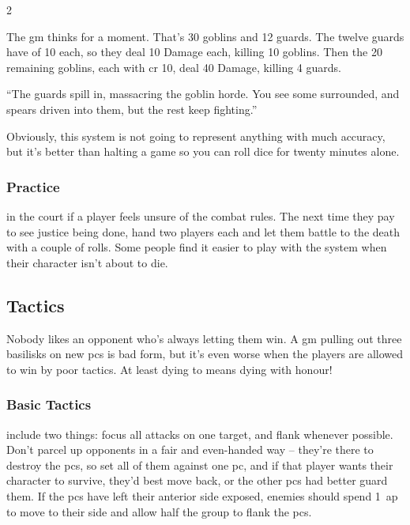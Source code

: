 \begin{multicols}{2}
\begin{exampletext}

  The \gls{gm} thinks for a moment.
  That's 30 goblins and 12 guards.
  The twelve guards have  of 10 each, so they deal 10 Damage each, killing 10 goblins.
  Then the 20 remaining goblins, each with \gls{cr} 10, deal 40 Damage, killing 4 guards.

  ``The guards spill in, massacring the goblin horde.
  You see some surrounded, and spears driven into them, but the rest keep fighting.''

\end{exampletext}

Obviously, this system is not going to represent anything with much accuracy, but it's better than halting a game so you can roll dice for twenty minutes alone.

\subsubsection{Practice}
in the \gls{court} if a player feels unsure of the \gls{combat} rules.
The next time they pay to see justice being done, hand two players  each and let them battle to the death with a couple of rolls.
Some people find it easier to play with the system when their character isn't about to die.

\subsection{Tactics}

Nobody likes an opponent who's always letting them win.
A \gls{gm} pulling out three \glspl{basilisk} on new \glspl{pc} is bad form, but it's even worse when the players are allowed to win by poor tactics.
At least dying to  means dying with honour!

\subsubsection{Basic Tactics}
include two things: focus all attacks on one target, and flank whenever possible.
Don't parcel up opponents in a fair and even-handed way -- they're there to destroy the \glspl{pc}, so set all of them against one \gls{pc}, and if that player wants their character to survive, they'd best move back, or the other \glspl{pc} had better guard them.%
If the \glspl{pc} have left their anterior side exposed, enemies should spend 1~\gls{ap} to move to their side and allow half the group to flank the \glspl{pc}.


\end{multicols}
